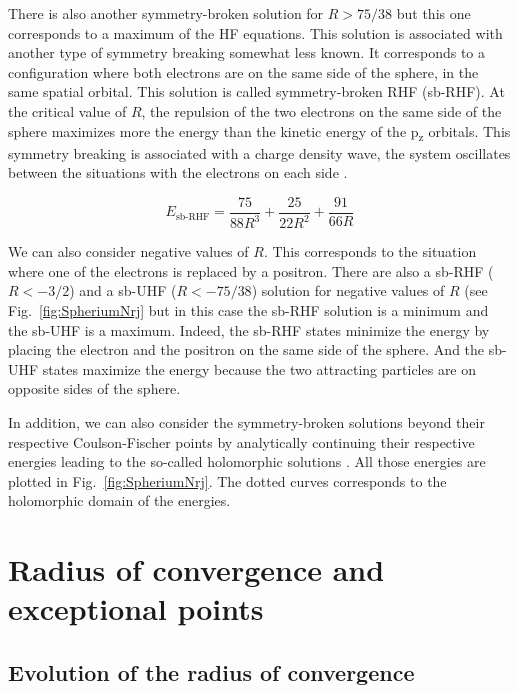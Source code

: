 \documentclass[11pt,a4paper]{article}
\begin{document}
There is also another symmetry-broken solution for $R>75/38$ but this one corresponds to a maximum of the HF equations. This solution is associated with another type of symmetry breaking somewhat less known. It corresponds to a configuration where both electrons are on the same side of the sphere, in the same spatial orbital. This solution is called symmetry-broken RHF (sb-RHF). At the critical value of $R$, the repulsion of the two electrons on the same side of the sphere maximizes more the energy than the kinetic energy of the p\textsubscript{z} orbitals. This symmetry breaking is associated with a charge density wave, the system oscillates between the situations with the electrons on each side \cite{GiulianiBook}.

\begin{equation}
E_{\text{sb-RHF}}=\frac{75}{88R^3}+\frac{25}{22R^2}+\frac{91}{66R}
\end{equation}

We can also consider negative values of $R$. This corresponds to the situation where one of the electrons is replaced by a positron. There are also a sb-RHF ($R<-3/2$) and a sb-UHF ($R<-75/38$) solution for negative values of $R$ (see Fig.~\ref{fig:SpheriumNrj} but in this case the sb-RHF solution is a minimum and the sb-UHF is a maximum. Indeed, the sb-RHF states minimize the energy by placing the electron and the positron on the same side of the sphere. And the sb-UHF states maximize the energy because the two attracting particles are on opposite sides of the sphere.

In addition, we can also consider the symmetry-broken solutions beyond their respective Coulson-Fischer points by analytically continuing their respective energies leading to the so-called holomorphic solutions \cite{Hiscock_2014, Burton_2019, Burton_2019a}. All those energies are plotted in Fig.~\ref{fig:SpheriumNrj}. The dotted curves corresponds to the holomorphic domain of the energies.


\section{Radius of convergence and exceptional points}

\subsection{Evolution of the radius of convergence}
\end{document}
